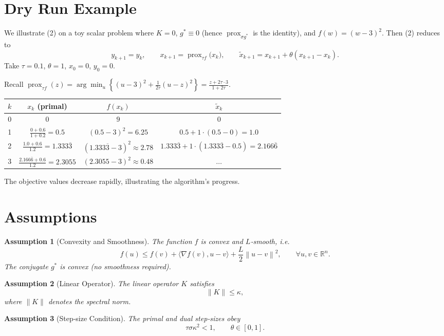 \documentclass[11pt]{article}
\newtheorem{assumption}{Assumption}
\newcommand{\prox}{\operatorname{prox}}
\newcommand{\ip}[2]{\langle #1,#2\rangle}
\newcommand{\norm}[1]{\left\|#1\right\|}
\begin{document}
\section*{Dry Run Example}
We illustrate (2) on a toy scalar problem where $K=0$, $g^{*}\equiv0$ (hence $\prox_{\sigma g^{*}}$ is the identity), and $f(w)=(w-3)^2$.  
Then (2) reduces to
\[
y_{k+1}=y_k,\qquad
x_{k+1}= \prox_{\tau f}\!\bigl(x_k\bigr),\qquad
\tilde x_{k+1}=x_{k+1}+\theta(x_{k+1}-x_k).
\]
Take $\tau=0.1$, $\theta=1$, $x_0=0$, $y_0=0$.

Recall $\prox_{\tau f}(z)=\arg\min_u\left\{(u-3)^2+\frac{1}{2\tau}(u-z)^2\right\}
      =\frac{z+2\tau\cdot3}{1+2\tau}$.

\begin{center}
\begin{tabular}{c|c|c|c}
$k$ & $x_k$ (primal) & $f(x_k)$ & $\tilde x_k$\\\hline
0 & $0$ & $9$ & $0$\\
1 & $\displaystyle\frac{0+0.6}{1+0.2}=0.5$ & $(0.5-3)^2=6.25$ & $0.5+1\cdot(0.5-0)=1.0$\\
2 & $\displaystyle\frac{1.0+0.6}{1.2}=1.333\overline{3}$ & $(1.333\overline{3}-3)^2\approx2.78$ & $1.333\overline{3}+1\cdot(1.333\overline{3}-0.5)=2.166\overline{6}$\\
3 & $\displaystyle\frac{2.166\overline{6}+0.6}{1.2}=2.3055$ & $(2.3055-3)^2\approx0.48$ & $\dots$
\end{tabular}
\end{center}
The objective values decrease rapidly, illustrating the algorithm’s progress.

\newpage
\section*{Assumptions}
\begin{assumption}[Convexity and Smoothness]\label{ass:convex}
The function $f$ is convex and $L$‑smooth, i.e.
\[
f(u)\le f(v)+\ip{\nabla f(v)}{u-v}+\frac{L}{2}\norm{u-v}^{2},
\qquad\forall u,v\in\mathbb{R}^{n}.
\]
The conjugate $g^{*}$ is convex (no smoothness required).
\end{assumption}
\begin{assumption}[Linear Operator]\label{ass:K}
The linear operator $K$ satisfies 
\[
\|K\|\le \kappa,
\]
where $\|K\|$ denotes the spectral norm.
\end{assumption}
\begin{assumption}[Step‑size Condition]\label{ass:steps}
The primal and dual step‑sizes obey
\[
\tau\sigma\kappa^{2}<1,
\qquad\theta\in[0,1].
\tag{3}
\]
\end{assumption}
\end{document}
